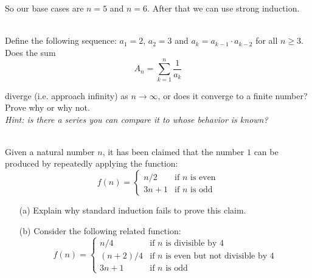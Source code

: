 \documentclass[11pt]{article}
\newif\ifsolutions
\begin{document}
\begin{qunlist}
So our base cases are $n=5$ and $n=6$.  After that we can use strong induction.
\fi



 \\
Define the following sequence: $a_1 =2$, $a_2 = 3$ and $a_k = a_{k-1} \cdot a_{k-2}$ for all $n \geq 3$. \\ 
Does the sum 
\[ A_n = \sum_{k=1}^n \frac{1}{a_k} \]

diverge (i.e. approach infinity) as $n \to \infty$, or does it converge to a finite number?  
Prove why or why not.  \\
{\em Hint: is there a series you can compare it to whose behavior is known?}

\ifsolutions
\textbf{Solutions:}
It does converge. We can first use strong induction to prove the claim
\[ a_k > 2^k, \quad \forall k \geq 4 \] 

For the base cases we have $a_4 = a_3 \cdot a_2 = 6 \cdot 3 = 18 > 2^4$ 
and $a_5 = a_4 \cdot a_3 = 18 \cdot 6 = 108 > 2^5$. Then for the inductive step we have
\[ a_{k+1} = a_k \cdot a_{k-1} > 2^k \cdot 2^{k-1} = 2^{2k-1} > 2^{k+1} \]

Therefore:
\[ \sum_{k=4}^n \frac{1}{a_k} < \sum_{k=4}^n \frac{1}{2^k} \]

Since the RHS converges as $n \to \infty$, we know the LHS converges.  
Adding a constant (i.e. the first three terms) does not change the fact that it converges.
\fi



 \\ 
Given a natural number $n$, it has been claimed that the number $1$ can be produced 
by repeatedly applying the function:
\[ f(n) = \left\{ \begin{array}{cl} n/2 & \text{if $n$ is even} \\
3n + 1 & \text{if $n$ is odd} \end{array} \right. \]

\begin{itemize}
\item[(a)] Explain why standard induction fails to prove this claim.
\item[(b)] Consider the following related function:
\[ f(n) = \left\{ \begin{array}{cl} n/4 & \text{if $n$ is divisible by 4} \\
(n+2)/4 & \text{if $n$ is even but not divisible by 4} \\
3n + 1 & \text{if $n$ is odd} \end{array} \right. \]


\end{itemize}
\end{qunlist}
\end{document}
